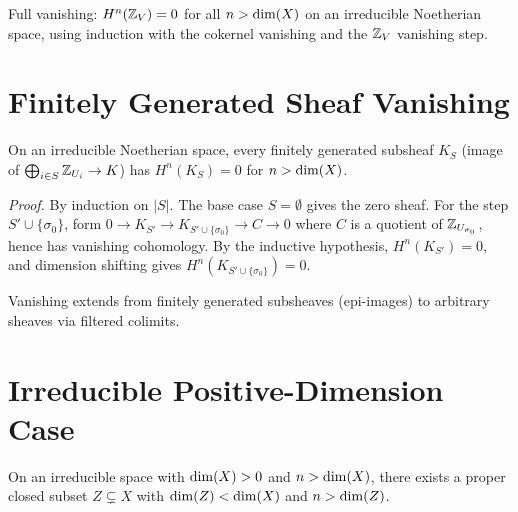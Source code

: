 \begin{theorem}\label{thm:zeroOutsideInt_cohomology_vanishing}
  \leanok
  Full vanishing: $H^n(\mathbb{Z}_V) = 0$ for all $n > \operatorname{dim}(X)$ on an
  irreducible Noetherian space, using induction with the cokernel
  vanishing and the $\mathbb{Z}_V$ vanishing step.
\end{theorem}


\chapter{Finitely Generated Sheaf Vanishing}\label{ch:fingen}

\begin{theorem}\label{thm:finsetGeneratedSheaf_vanishing}
  \leanok
  On an irreducible Noetherian space, every finitely generated subsheaf $K_S$
  (image of $\bigoplus_{i \in S} \mathbb{Z}_{U_i} \to K$) has $H^n(K_S) = 0$ for
  $n > \operatorname{dim}(X)$.

  \emph{Proof.} By induction on $|S|$. The base case $S = \emptyset$ gives the
  zero sheaf. For the step $S' \cup \{\sigma_0\}$, form
  $0 \to K_{S'} \to K_{S' \cup \{\sigma_0\}} \to C \to 0$
  where $C$ is a quotient of $\mathbb{Z}_{U_{\sigma_0}}$, hence has vanishing cohomology.
  By the inductive hypothesis, $H^n(K_{S'}) = 0$, and dimension shifting gives
  $H^n(K_{S' \cup \{\sigma_0\}}) = 0$.
\end{theorem}

\begin{theorem}\label{thm:directLimit_cohomology_vanishing}
  \leanok
  Vanishing extends from finitely generated subsheaves (epi-images)
  to arbitrary sheaves via filtered colimits.
\end{theorem}


\chapter{Irreducible Positive-Dimension Case}\label{ch:irredpos}

\begin{lemma}\label{lem:exists_closed_subset}
  \leanok
  On an irreducible space with $\operatorname{dim}(X) > 0$ and $n > \operatorname{dim}(X)$,
  there exists a proper closed subset $Z \subsetneq X$ with $\operatorname{dim}(Z) < \operatorname{dim}(X)$
  and $n > \operatorname{dim}(Z)$.
\end{lemma}

